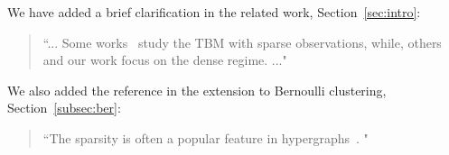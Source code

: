 \documentclass[11pt]{article}
\theoremstyle{definition}
\theoremstyle{definition}
\begin{document}
We have added a brief clarification in the related work, Section~\ref{sec:intro}:
\begin{quote}
    ``... Some works~\citep{ahn2018hypergraph} study the TBM with sparse observations, while, others~\citep{wang2019multiway, han2020exact} and our work focus on the dense regime. ..."
\end{quote}

We also added the reference in the extension to Bernoulli clustering, Section~\ref{subsec:ber}:
\begin{quote}
    ``The sparsity is often a popular feature in hypergraphs~\citep{florescu2016spectral,ke2019community, ahn2018hypergraph}.
    "
\end{quote}


\newpage


    
    
    
    
    
\end{document}
